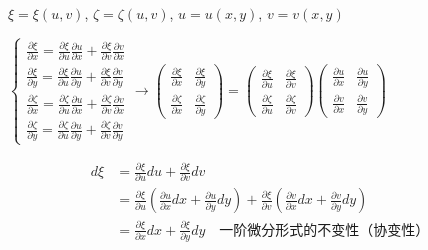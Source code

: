 \begin{example}
    $\xi=\xi(u,v)$, $\zeta=\zeta(u,v)$, $u=u(x,y)$, $v=v(x,y)$

    $\begin{cases}
            \frac{\partial\xi}{\partial x}=\frac{\partial\xi}{\partial u}\frac{\partial u}{\partial x}+\frac{\partial\xi}{\partial v}\frac{\partial v}{\partial x}       \\
            \frac{\partial\xi}{\partial y}=\frac{\partial\xi}{\partial u}\frac{\partial u}{\partial y}+\frac{\partial\xi}{\partial v}\frac{\partial v}{\partial y}       \\
            \frac{\partial\zeta}{\partial x}=\frac{\partial\zeta}{\partial u}\frac{\partial u}{\partial x}+\frac{\partial\zeta}{\partial v}\frac{\partial v}{\partial x} \\
            \frac{\partial\zeta}{\partial y}=\frac{\partial\zeta}{\partial u}\frac{\partial u}{\partial y}+\frac{\partial\zeta}{\partial v}\frac{\partial v}{\partial y}
        \end{cases}\rightarrow\begin{pmatrix}
            \frac{\partial\xi}{\partial x}   & \frac{\partial\xi}{\partial y}   \\
            \frac{\partial\zeta}{\partial x} & \frac{\partial\zeta}{\partial y}
        \end{pmatrix}=\begin{pmatrix}
            \frac{\partial\xi}{\partial u}   & \frac{\partial\xi}{\partial v}   \\
            \frac{\partial\zeta}{\partial u} & \frac{\partial\zeta}{\partial v}
        \end{pmatrix}\begin{pmatrix}
            \frac{\partial u}{\partial x} & \frac{\partial u}{\partial y} \\
            \frac{\partial v}{\partial x} & \frac{\partial v}{\partial y}
        \end{pmatrix}$

    \begin{align*}
        d\xi & =\frac{\partial\xi}{\partial u}du+\frac{\partial\xi}{\partial v}dv                                                                                                                                                     \\
             & =\frac{\partial\xi}{\partial u}\left(\frac{\partial u}{\partial x}dx+\frac{\partial u}{\partial y}dy\right)+\frac{\partial\xi}{\partial v}\left(\frac{\partial v}{\partial x}dx+\frac{\partial v}{\partial y}dy\right) \\
             & =\frac{\partial\xi}{\partial x}dx+\frac{\partial\xi}{\partial y}dy\quad\text{一阶微分形式的不变性（协变性）}
    \end{align*}


\end{example}
